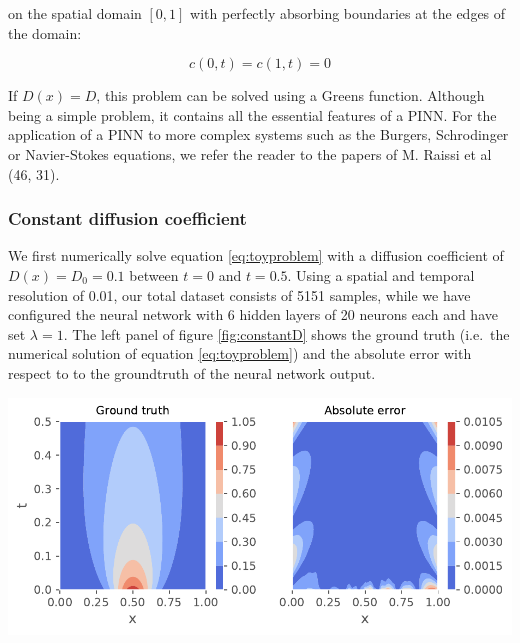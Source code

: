 \documentclass{Dissertate}
\let\origfigure\figure
\let\endorigfigure\endfigure
\renewenvironment{figure}[1][2] {
    \expandafter\origfigure\expandafter[H]
} {
    \endorigfigure
}
\begin{document}
on the spatial domain \([0,1]\) with perfectly absorbing boundaries at
the edges of the domain:

\[
c(0,t) = c(1,t) = 0
\]

If \(D(x) = D\), this problem can be solved using a Greens function.
Although being a simple problem, it contains all the essential features
of a PINN. For the application of a PINN to more complex systems such as
the Burgers, Schrodinger or Navier-Stokes equations, we refer the reader
to the papers of M. Raissi et al (46, 31).

\hypertarget{constant-diffusion-coefficient}{%
\subsubsection{Constant diffusion
coefficient}\label{constant-diffusion-coefficient}}

We first numerically solve equation \ref{eq:toyproblem} with a
diffusion coefficient of \(D(x) = D_0 = 0.1\) between \(t=0\) and
\(t=0.5\). Using a spatial and temporal resolution of 0.01, our total
dataset consists of 5151 samples, while we have configured the neural
network with 6 hidden layers of 20 neurons each and have set
\(\lambda=1\). The left panel of figure \ref{fig:constantD} shows
the ground truth (i.e.~the numerical solution of equation
\ref{eq:toyproblem}) and the absolute error with respect to to the groundtruth
of the neural network output.

\begin{figure}
\hypertarget{fig:constantD}{%
\centering
\includegraphics{source/figures/pdf/error_constantD.pdf}
\caption{\textbf{Left panel}: Simulated ground truth of the problem.
\textbf{Right panel}: The absolute error of neural network. Note that
most of the error is located at areas with low concentration,
i.e.~signal.}\label{fig:constantD}
}
\end{figure}
\end{document}
